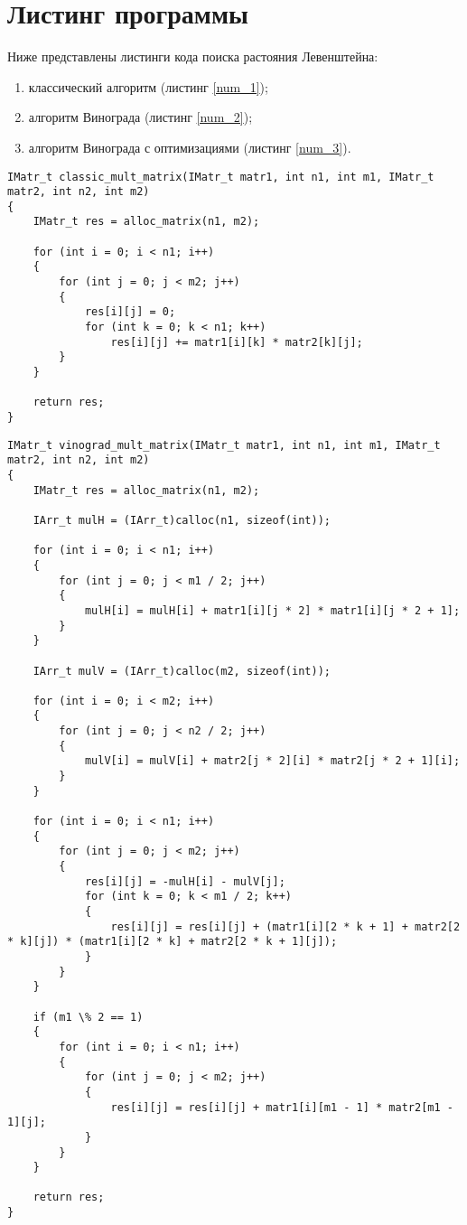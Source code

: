 \documentclass[utf8x, 12pt]{G7-32}
\begin{document}
    \section{Листинг программы}
        Ниже представлены листинги кода поиска растояния Левенштейна: \begin{enumerate}
            \item классический алгоритм (листинг \ref{num_1});
            \item алгоритм Винограда (листинг \ref{num_2});
            \item алгоритм Винограда с оптимизациями (листинг \ref{num_3}).
        \end{enumerate}

\begin{lstlisting}[label=num_1,caption=Классический алгоритма умножения матриц, escapechar=@]
IMatr_t classic_mult_matrix(IMatr_t matr1, int n1, int m1, IMatr_t matr2, int n2, int m2)
{
    IMatr_t res = alloc_matrix(n1, m2);

    for (int i = 0; i < n1; i++)
    {
        for (int j = 0; j < m2; j++)
        {
            res[i][j] = 0;
            for (int k = 0; k < n1; k++)
                res[i][j] += matr1[i][k] * matr2[k][j];
        }
    }

    return res;
}
\end{lstlisting}

\newpage
\begin{lstlisting}[label=num_2,caption=Алгоритма Винограда]
IMatr_t vinograd_mult_matrix(IMatr_t matr1, int n1, int m1, IMatr_t matr2, int n2, int m2)
{
    IMatr_t res = alloc_matrix(n1, m2);

    IArr_t mulH = (IArr_t)calloc(n1, sizeof(int));

    for (int i = 0; i < n1; i++)
    {
        for (int j = 0; j < m1 / 2; j++)
        {
            mulH[i] = mulH[i] + matr1[i][j * 2] * matr1[i][j * 2 + 1];
        }
    }

    IArr_t mulV = (IArr_t)calloc(m2, sizeof(int));

    for (int i = 0; i < m2; i++)
    {
        for (int j = 0; j < n2 / 2; j++)
        {
            mulV[i] = mulV[i] + matr2[j * 2][i] * matr2[j * 2 + 1][i];
        }
    }

    for (int i = 0; i < n1; i++)
    {
        for (int j = 0; j < m2; j++)
        {
            res[i][j] = -mulH[i] - mulV[j];
            for (int k = 0; k < m1 / 2; k++)
            {
                res[i][j] = res[i][j] + (matr1[i][2 * k + 1] + matr2[2 * k][j]) * (matr1[i][2 * k] + matr2[2 * k + 1][j]);
            }
        }
    }

    if (m1 \% 2 == 1)
    {
        for (int i = 0; i < n1; i++)
        {
            for (int j = 0; j < m2; j++)
            {
                res[i][j] = res[i][j] + matr1[i][m1 - 1] * matr2[m1 - 1][j];
            }
        }
    }

    return res;
}
\end{lstlisting}
\end{document}

